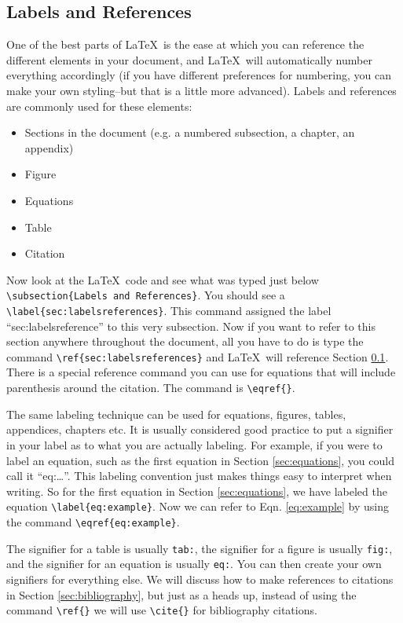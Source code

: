 \documentclass[]{article}%
\newcommand{\bs}{\textbackslash}
\newcommand{\TT}[1]{\texttt{#1}}
\newcommand{\tpc}{\textperiodcentered}
\theoremstyle{definition}
\begin{document}
\subsection{Labels and References}
\label{sec:labelsreferences}
One of the best parts of \LaTeX\ is the ease at which you can reference the different elements in your document, and \LaTeX\ will automatically number everything accordingly (if you have different preferences for numbering, you can make your own styling--but that is a little more advanced).
Labels and references are commonly used for these elements:
\begin{itemize}
 	\item Sections in the document (e.g. a numbered subsection, a chapter, an appendix)
 	\item Figure
 	\item Equations
 	\item Table
 	\item Citation
\end{itemize} 
Now look at the \LaTeX\ code and see what was typed just below \TT{\bs subsection\{Labels and References\}}. You should see a \TT{\bs label\{sec:labelsreferences\}}.
This command assigned the label ``sec:labelsreference'' to this very subsection.
Now if you want to refer to this section anywhere throughout the document, all you have to do is type the command \TT{\bs ref\{sec:labelsreferences\}} and \LaTeX\ will reference Section \ref{sec:labelsreferences}.
There is a special reference command you can use for equations that will include parenthesis around the citation.
The command is \TT{\bs eqref\{\tpc\}}.

The same labeling technique can be used for equations, figures, tables, appendices, chapters etc.
It is usually considered good practice to put a signifier in your label as to what you are actually labeling.
For example, if you were to label an equation, such as the first equation in Section \ref{sec:equations}, you could call it ``eq:\dots''.
This labeling convention just makes things easy to interpret when writing.
So for the first equation in Section \ref{sec:equations}, we have labeled the equation \TT{\bs label\{eq:example\}}.
Now we can refer to Eqn. \eqref{eq:example} by using the command \TT{\bs eqref\{eq:example\}}.

The signifier for a table is usually \TT{tab:}, the signifier for a figure is usually \TT{fig:}, and the signifier for an equation is usually \texttt{eq:}.
You can then create your own signifiers for everything else.
We will discuss how to make references to citations in Section \ref{sec:bibliography}, but just as a heads up, instead of using the command \TT{\bs ref\{\tpc\}} we will use \TT{\bs cite\{\tpc\}} for bibliography citations.
\end{document}
